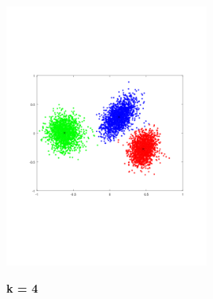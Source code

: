 \documentclass[11pt]{article}
\begin{document}
\includegraphics[width=0.5\textwidth]{q4/k3_4.png}

\newpage

\textbf{k = 4}
\end{document}
